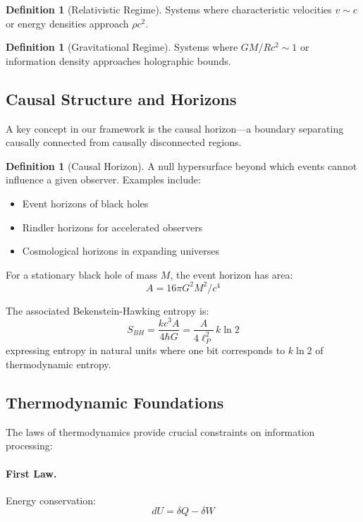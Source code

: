 \documentclass[11pt,a4paper]{article}
\theoremstyle{plain}
\theoremstyle{definition}
\newtheorem{definition}[theorem]{Definition}
\theoremstyle{remark}
\begin{document}
\begin{definition}[Relativistic Regime]
Systems where characteristic velocities $v \sim c$ or energy densities approach $\rho c^2$.
\end{definition}

\begin{definition}[Gravitational Regime]
Systems where $GM/Rc^2 \sim 1$ or information density approaches holographic bounds.
\end{definition}

\subsection{Causal Structure and Horizons}

A key concept in our framework is the causal horizon—a boundary separating causally connected from causally disconnected regions.

\begin{definition}[Causal Horizon]
A null hypersurface beyond which events cannot influence a given observer. Examples include:
\begin{itemize}
\item Event horizons of black holes
\item Rindler horizons for accelerated observers
\item Cosmological horizons in expanding universes
\end{itemize}
\end{definition}

For a stationary black hole of mass $M$, the event horizon has area:
\begin{equation}
A = 16\pi G^2 M^2/c^4
\end{equation}

The associated Bekenstein-Hawking entropy is:
\begin{equation}
S_{BH} = \frac{kc^3 A}{4\hbar G} = \frac{A}{4\ell_P^2}\,k\ln 2
\end{equation}
expressing entropy in natural units where one bit corresponds to $k\ln 2$ of thermodynamic entropy.

\subsection{Thermodynamic Foundations}

The laws of thermodynamics provide crucial constraints on information processing:

\paragraph{First Law.} Energy conservation:
\begin{equation}
dU = \delta Q - \delta W
\end{equation}
\end{document}
